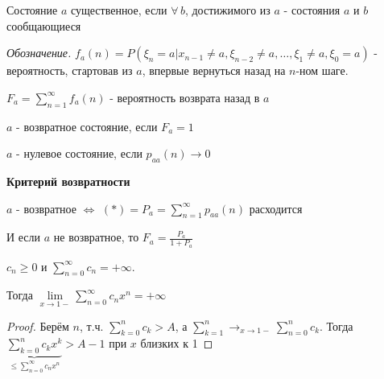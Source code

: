 \begin{definition}
    Состояние $a$ существенное, если $\forall \, b$, достижимого из $a$ - состояния $a$ и $b$ сообщающиеся
\end{definition}

\textit{Обозначение. } $f_{a} (n) = P(\xi_n = a | x_{n - 1} \neq a, \xi_{n - 2} \neq a, \ldots, \xi_1 \neq a, \xi_0 = a)$ - вероятность, стартовав из $a$, впервые вернуться назад на $n$-ном шаге.

$F_a = \sum\limits_{n = 1}^\infty f_{a} (n)$ - вероятность возврата назад в $a$

\begin{definition}
    $a$ - возвратное состояние, если $F_a = 1$
\end{definition}

\begin{definition}
    $a$ - нулевое состояние, если $p_{aa} (n) \rightarrow 0$
\end{definition}

\begin{theorem}
    \textbf{Критерий возвратности}

    $a$ - возвратное $\Longleftrightarrow$ $(*) = P_a = \sum\limits_{n = 1}^\infty p_{aa} (n)$ расходится

    И если $a$ не возвратное, то $F_a = \frac{P_a}{1 + P_a}$
\end{theorem}

\begin{lemma}
    $c_n \geqslant 0$ и $\sum_{n=0}^{\infty} c_n = +\infty$. 

    Тогда $\lim\limits_{x\to 1-} \sum_{n=0}^{\infty} c_nx^n = +\infty$
\end{lemma}

\begin{proof}
    Берём $n$, т.ч. $\sum_{k=0}^{n} c_k > A$, а $\sum_{k=1}^{n} \rightarrow_{x\to 1-} \sum_{n=0}^{n}c_k$. Тогда
    $\underbrace{\sum_{k=0}^{n} c_kx^k}_{\leqslant \sum_{n=0}^{\infty} c_nx^n} > A - 1$ при $x$ близких к 1
\end{proof}

